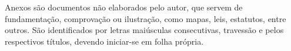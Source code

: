 
\begin{anexosenv}

\begin{KeepFromToc}
\partanexos
\end{KeepFromToc}

Anexos são documentos não elaborados pelo autor, que servem de fundamentação, comprovação ou ilustração, como mapas, leis, estatutos, entre outros. São identificados por letras maiúsculas consecutivas, travessão e pelos respectivos títulos, devendo iniciar-se em folha própria.

\end{anexosenv}